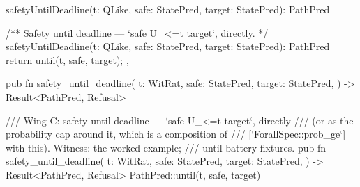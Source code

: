 \begin{tssrc}
safetyUntilDeadline(t: QLike, safe: StatePred, target: StatePred): PathPred
\end{tssrc}
\begin{tssrc}
/** Safety until deadline — `safe U_{<=t} target`, directly. */
safetyUntilDeadline(t: QLike, safe: StatePred, target: StatePred): PathPred {
  return until(t, safe, target);
},
\end{tssrc}
\begin{rustsrc}
pub fn safety_until_deadline(
    t: WitRat,
    safe: StatePred,
    target: StatePred,
) -> Result<PathPred, Refusal>
\end{rustsrc}
\begin{rustsrc}
/// Wing C: safety until deadline — `safe U_{<=t} target`, directly
/// (or as the probability cap around it, which is a composition of
/// [`ForallSpec::prob_ge`] with this). Witness: the worked example;
/// until-battery fixtures.
pub fn safety_until_deadline(
    t: WitRat,
    safe: StatePred,
    target: StatePred,
) -> Result<PathPred, Refusal> {
    PathPred::until(t, safe, target)
}
\end{rustsrc}
